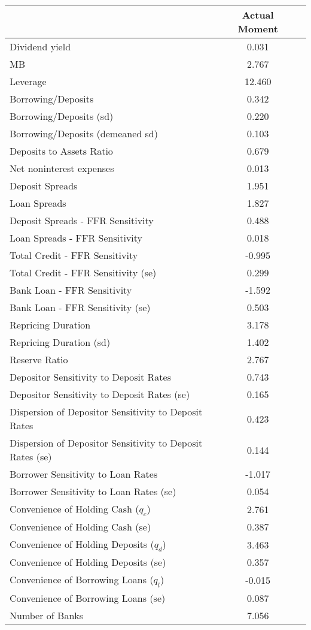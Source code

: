 \begin{tabular*}{\hsize}{@{\hskip\tabcolsep\extracolsep\fill}l*{2}{c}}\hline \hline & {Actual Moment}  &    \\ [1ex] \hline  Dividend yield&0.031&\\
MB&2.767&\\
Leverage&12.460&\\
Borrowing/Deposits&0.342&\\
Borrowing/Deposits (sd)&0.220&\\
Borrowing/Deposits (demeaned sd)&0.103&\\
Deposits to Assets Ratio&0.679&\\
Net noninterest expenses&0.013&\\
Deposit Spreads&1.951&\\
Loan Spreads&1.827&\\
Deposit Spreads - FFR Sensitivity&0.488&\\
Loan Spreads - FFR Sensitivity&0.018&\\
Total Credit - FFR Sensitivity&-0.995&\\
Total Credit - FFR Sensitivity (se)&0.299&\\
Bank Loan - FFR Sensitivity&-1.592&\\
Bank Loan - FFR Sensitivity (se)&0.503&\\
Repricing Duration&3.178&\\
Repricing Duration (sd)&1.402&\\
Reserve Ratio&2.767&\\
Depositor Sensitivity to Deposit Rates&0.743&\\
Depositor Sensitivity to Deposit Rates (se)&0.165&\\
Dispersion of Depositor Sensitivity to Deposit Rates&0.423&\\
Dispersion of Depositor Sensitivity to Deposit Rates (se)&0.144&\\
Borrower Sensitivity to Loan Rates&-1.017&\\
Borrower Sensitivity to Loan Rates (se)&0.054&\\
Convenience of Holding Cash ($q_c$)&2.761&\\
Convenience of Holding Cash (se)&0.387&\\
Convenience of Holding Deposits ($q_d$)&3.463&\\
Convenience of Holding Deposits (se)&0.357&\\
Convenience of Borrowing Loans ($q_l$)&-0.015&\\
Convenience of Borrowing Loans (se)&0.087&\\
Number of Banks&7.056&\\
\hline \hline \end{tabular*}
